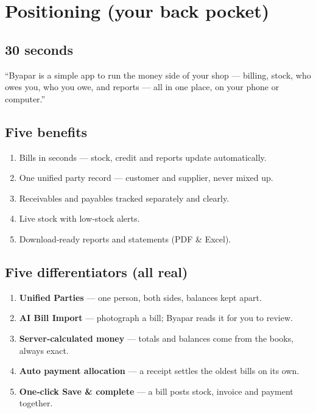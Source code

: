 \documentclass[11pt,a4paper,openany]{article}
\begin{document}
\clearpage
\section{Positioning (your back pocket)}
\subsection{30 seconds}
``Byapar is a simple app to run the money side of your shop — billing, stock, who owes
you, who you owe, and reports — all in one place, on your phone or computer.''
\subsection{Five benefits}
\begin{enumerate}[leftmargin=1.3em,itemsep=1pt]
\item Bills in seconds — stock, credit and reports update automatically.
\item One unified party record — customer and supplier, never mixed up.
\item Receivables and payables tracked separately and clearly.
\item Live stock with low‑stock alerts.
\item Download‑ready reports and statements (PDF \& Excel).
\end{enumerate}
\subsection{Five differentiators (all real)}
\begin{enumerate}[leftmargin=1.3em,itemsep=1pt]
\item \textbf{Unified Parties} — one person, both sides, balances kept apart.
\item \textbf{AI Bill Import} — photograph a bill; Byapar reads it for you to review.
\item \textbf{Server‑calculated money} — totals and balances come from the books, always exact.
\item \textbf{Auto payment allocation} — a receipt settles the oldest bills on its own.
\item \textbf{One‑click Save \& complete} — a bill posts stock, invoice and payment together.
\end{enumerate}

\end{document}
